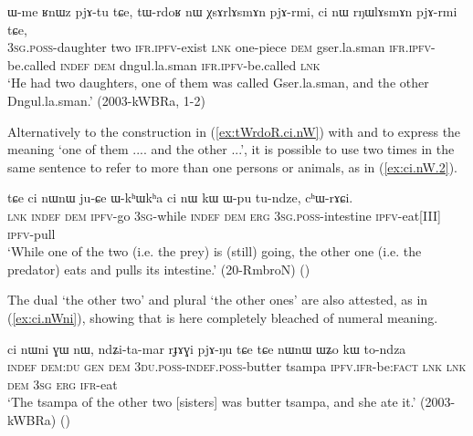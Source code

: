 \begin{exe}
\ex \label{ex:tWrdoR.ci.nW}
 \gll 
ɯ-me ʁnɯz pjɤ-tu tɕe, tɯ-rdoʁ nɯ χsɤrlɤsmɤn pjɤ-rmi, ci nɯ rŋɯlɤsmɤn pjɤ-rmi tɕe, \\
\textsc{3sg}.\textsc{poss}-daughter two \textsc{ifr}.\textsc{ipfv}-exist \textsc{lnk} one-piece \textsc{dem} gser.la.sman \textsc{ifr}.\textsc{ipfv}-be.called \textsc{indef} \textsc{dem} dngul.la.sman \textsc{ifr}.\textsc{ipfv}-be.called \textsc{lnk} \\
\glt `He had two daughters, one of them was called Gser.la.sman, and the other Dngul.la.sman.' (2003-kWBRa, 1-2)
\end{exe}

Alternatively to the construction in (\ref{ex:tWrdoR.ci.nW}) with  and  to express the meaning `one of them .... and the other ...', it is possible to use  two times in the same sentence to refer to more than one persons or animals, as in (\ref{ex:ci.nW.2}).

\begin{exe}
\ex \label{ex:ci.nW.2}
 \gll tɕe ci nɯnɯ ju-ɕe ɯ-kʰɯkʰa ci nɯ kɯ ɯ-pu tu-ndze, cʰɯ-rɤɕi. \\
\textsc{lnk} \textsc{indef} \textsc{dem} \textsc{ipfv}-go \textsc{3sg}-while \textsc{indef} \textsc{dem} \textsc{erg} \textsc{3sg}.\textsc{poss}-intestine \textsc{ipfv}-eat[III] \textsc{ipfv}-pull \\
\glt `While one of the two (i.e. the prey) is (still) going, the other one (i.e. the predator) eats and pulls its intestine.'  (20-RmbroN)
()
\end{exe}

The dual  `the other two' and plural  `the other ones' are also attested, as in (\ref{ex:ci.nWni}), showing that  is here completely bleached of numeral meaning.

 \begin{exe}
\ex \label{ex:ci.nWni}
 \gll  ci nɯni ɣɯ nɯ, ndʑi-ta-mar rɟɤɣi pjɤ-ŋu tɕe tɕe nɯnɯ ɯʑo kɯ to-ndza \\
\textsc{indef} \textsc{dem}:\textsc{du} \textsc{gen} \textsc{dem} \textsc{3du}.\textsc{poss}-\textsc{indef}.\textsc{poss}-butter tsampa \textsc{ipfv}.\textsc{ifr}-be:\textsc{fact} \textsc{lnk} \textsc{lnk} \textsc{dem} \textsc{3sg} \textsc{erg} \textsc{ifr}-eat \\
\glt `The tsampa of the other two [sisters] was butter tsampa, and she ate it.' (2003-kWBRa)
()
\end{exe}

